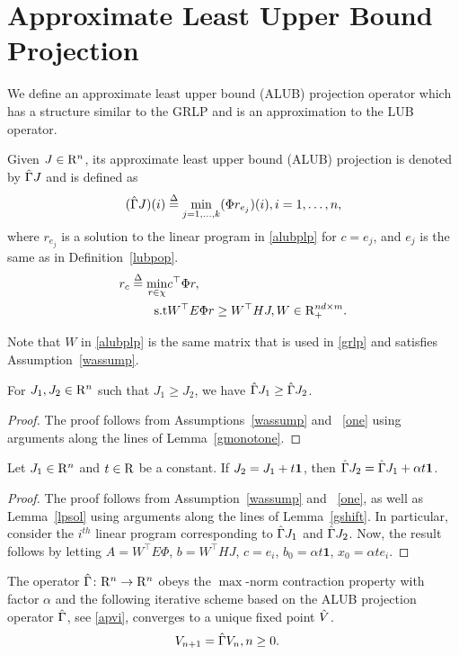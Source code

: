 \section{Approximate Least Upper Bound Projection}\label{sec:alubp}
We define an approximate least upper bound (ALUB) projection operator which has a structure similar to the GRLP and is an approximation to the LUB operator.
\begin{definition}\label{alubpop}
Given $J\in \mathrm{R}^n$, its approximate least upper bound (ALUB) projection is denoted by $\hat{\Gamma} J$ and is defined as 
\begin{align}\label{tgamdef}
(\hg J)(i)\stackrel{\Delta}{=}\underset{j=1,\ldots,k}{\min} (\Phi r_{e_j})(i), \mb i=1,\ldots,n,
\end{align}
where $r_{e_j}$ is a solution to the linear program in \eqref{alubplp} for $c=e_j$, and $e_j$ is the same as in Definition~\ref{lubpop}.
\begin{align}\label{alubplp}
r_c\stackrel{\Delta}{=}\min_{r\in \chi} &c^\top \Phi r,\nn\\
\text{s.t}\mb &W^\top E \Phi r\geq W^\top HJ, W \in \R^{nd\times m}_+ .
\end{align}
\end{definition}
Note that $W$ in \eqref{alubplp} is the same matrix that is used in \eqref{grlp} and satisfies Assumption~\ref{wassump}.
\begin{lemma}\label{tgmonotone}
For $J_1, J_2\in \mathrm{R}^n$ such that $J_1\geq J_2$, we have $\hat{\Gamma} J_1\geq \hat{\Gamma} J_2$.
\end{lemma}
\begin{proof}
The proof follows from Assumptions~\ref{wassump} and ~\ref{one} using arguments along the lines of Lemma~\ref{gmonotone}.
\end{proof}
\begin{lemma}\label{tgshift}
Let $J_1\in \mathrm{R}^n$ and $t\in \mathrm{R}$ be a constant. If $J_2=J_1+t\mathbf{1}$, then $\hat{\Gamma} J_2=\hat{\Gamma} J_1+\alpha t\mathbf{1}$.
\end{lemma}
\begin{proof}
The proof follows from Assumption~\ref{wassump} and ~\ref{one}, as well as Lemma~\ref{lpsol} using arguments along the lines of Lemma~\ref{gshift}. In particular, consider the $i^{th}$ linear program corresponding to $\hat{\Gamma} J_1$ and $\hat{\Gamma} J_2$. Now, the result follows by letting $A=W^\top E \Phi$, $b=W^\top H J$, $c=e_i$, $b_0=\alpha t \mathbf{1}$, $x_0=\alpha t e_i$.
\end{proof}
\begin{theorem}\label{tgmaxcontra}
The operator $\hat{\Gamma} \colon \mathrm{R}^n\rightarrow \mathrm{R}^n$ obeys the $\max$-norm contraction property with factor $\alpha$ and the following iterative scheme based on the ALUB projection operator $\hat{\Gamma}$, see \eqref{apvi}, converges to a unique fixed point $\hat{V}$.
\begin{align}\label{apvi}
V_{n+1}&=\hg V_n,\mb n\geq 0.
\end{align}
\end{theorem}
